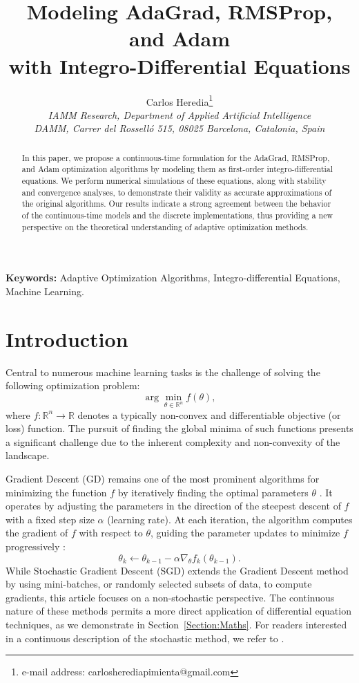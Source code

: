 \documentclass{article} %
\title{Modeling AdaGrad, RMSProp, and Adam \\ with Integro-Differential Equations}
\author{
Carlos Heredia\thanks{e-mail address: carlosherediapimienta@gmail.com} \\
\textit{IAMM Research, Department of Applied Artificial Intelligence} \\
\textit{DAMM, Carrer del Rossell\'o 515, 08025 Barcelona, Catalonia, Spain}
}
\begin{document}
\maketitle

\begin{abstract}
In this paper, we propose a continuous-time formulation for the AdaGrad, RMSProp, and Adam optimization algorithms by modeling them as first-order integro-differential equations. We perform numerical simulations of these equations, along with stability and convergence analyses, to demonstrate their validity as accurate approximations of the original algorithms. Our results indicate a strong agreement between the behavior of the continuous-time models and the discrete implementations, thus providing a new perspective on the theoretical understanding of adaptive optimization methods.
\end{abstract}

\noindent \textbf{Keywords:} Adaptive Optimization Algorithms, Integro-differential Equations, Machine Learning.

\section{Introduction}

Central to numerous machine learning tasks is the challenge of solving the following optimization problem:
\[
\arg \min_{\theta \in \mathbb{R}^n} f(\theta),
\]
where \( f: \mathbb{R}^n \rightarrow \mathbb{R} \) denotes a typically non-convex and differentiable objective (or loss) function. The pursuit of finding the global minima of such functions presents a significant challenge due to the inherent complexity and non-convexity of the landscape.

Gradient Descent (GD) remains one of the most prominent algorithms for minimizing the function \( f \) by iteratively finding the optimal parameters \( \theta \) \cite{boyd2004}. It operates by adjusting the parameters in the direction of the steepest descent of \( f \) with a fixed step size \( \alpha \) (learning rate). At each iteration, the algorithm computes the gradient of \( f \) with respect to \( \theta \), guiding the parameter updates to minimize \( f \) progressively \cite{Rumelhart1986}:
\begin{equation}\label{intro:GD}
    \theta_{k} \leftarrow \theta_{k-1}  - \alpha \nabla_\theta f_{k}(\theta_{k-1}).
\end{equation}
While Stochastic Gradient Descent (SGD) \cite{Bottou2010} extends the Gradient Descent method by using mini-batches, or randomly selected subsets of data, to compute gradients, this article focuses on a non-stochastic perspective. The continuous nature of these methods permits a more direct application of differential equation techniques, as we demonstrate in Section~\ref{Section:Maths}. For readers interested in a continuous description of the stochastic method, we refer to \cite{sirignano2017stochastic}.
\end{document}
